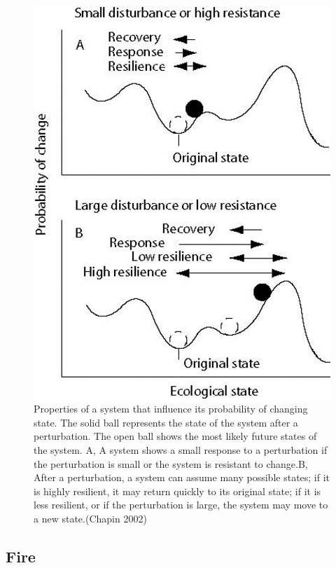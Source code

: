 \documentclass[
  12pt,
  oneside]{book}
\begin{document}
\begin{figure}

{\centering \includegraphics[width=0.8\linewidth]{figures/chap8/f84_disturbance2_chapin} 

}

\caption{Properties of a system that influence its probability of changing state. The solid ball represents the state of the system after a perturbation. The open ball shows the most likely future states of the system. A, A system shows a small response to a perturbation if the perturbation is small or the system is resistant to change.B, After a perturbation, a system can assume many possible states; if it is highly resilient, it may return quickly to its original state; if it is less resilient, or if the perturbation is large, the system may move to a new state.(Chapin 2002)}\label{fig:f84}
\end{figure}

\hypertarget{fire}{%
\subsection{Fire}\label{fire}}
\end{document}
